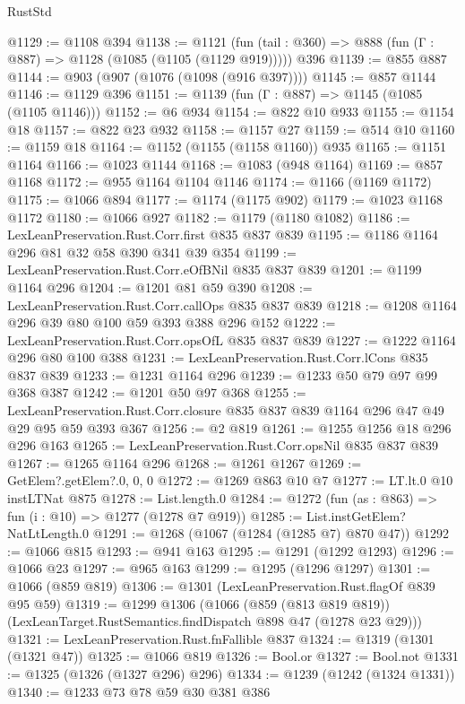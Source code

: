 \begin{lexlean}{RustStd}
\begin{coremodule}
{\begin{coremodule}
{{{{{{{{{@1129 := @1108 @394
@1138 := @1121
    (fun (tail : @360) => @888 (fun (Γ : @887) => @1128 (@1085 (@1105 (@1129 @919)))))
    @396
@1139 := @855 @887
@1144 := @903 (@907 (@1076 (@1098 (@916 @397))))
@1145 := @857 @1144
@1146 := @1129 @396
@1151 := @1139 (fun (Γ : @887) => @1145 (@1085 (@1105 @1146)))
@1152 := @6 @934
@1154 := @822 @10 @933
@1155 := @1154 @18
@1157 := @822 @23 @932
@1158 := @1157 @27
@1159 := @514 @10
@1160 := @1159 @18
@1164 := @1152 (@1155 (@1158 @1160)) @935
@1165 := @1151 @1164
@1166 := @1023 @1144
@1168 := @1083 (@948 @1164)
@1169 := @857 @1168
@1172 := @955 @1164 @1104 @1146
@1174 := @1166 (@1169 @1172)
@1175 := @1066 @894
@1177 := @1174 (@1175 @902)
@1179 := @1023 @1168 @1172
@1180 := @1066 @927
@1182 := @1179 (@1180 @1082)
@1186 := LexLeanPreservation.Rust.Corr.first @835 @837 @839
@1195 := @1186 @1164 @296 @81 @32 @58 @390 @341 @39 @354
@1199 := LexLeanPreservation.Rust.Corr.eOfBNil @835 @837 @839
@1201 := @1199 @1164 @296
@1204 := @1201 @81 @59 @390
@1208 := LexLeanPreservation.Rust.Corr.callOps @835 @837 @839
@1218 := @1208 @1164 @296 @39 @80 @100 @59 @393 @388 @296 @152
@1222 := LexLeanPreservation.Rust.Corr.opsOfL @835 @837 @839
@1227 := @1222 @1164 @296 @80 @100 @388
@1231 := LexLeanPreservation.Rust.Corr.lCons @835 @837 @839
@1233 := @1231 @1164 @296
@1239 := @1233 @50 @79 @97 @99 @368 @387
@1242 := @1201 @50 @97 @368
@1255 := LexLeanPreservation.Rust.Corr.closure
    @835
    @837
    @839
    @1164
    @296
    @47
    @49
    @29
    @95
    @59
    @393
    @367
@1256 := @2 @819
@1261 := @1255 @1256 @18 @296 @296 @163
@1265 := LexLeanPreservation.Rust.Corr.opsNil @835 @837 @839
@1267 := @1265 @1164 @296
@1268 := @1261 @1267
@1269 := GetElem?.getElem?.{0, 0, 0}
@1272 := @1269 @863 @10 @7
@1277 := LT.lt.{0} @10 instLTNat @875
@1278 := List.length.{0}
@1284 := @1272 (fun (as : @863) => fun (i : @10) => @1277 (@1278 @7 @919))
@1285 := List.instGetElem?NatLtLength.{0}
@1291 := @1268 (@1067 (@1284 (@1285 @7) @870 @47))
@1292 := @1066 @815
@1293 := @941 @163
@1295 := @1291 (@1292 @1293)
@1296 := @1066 @23
@1297 := @965 @163
@1299 := @1295 (@1296 @1297)
@1301 := @1066 (@859 @819)
@1306 := @1301 (LexLeanPreservation.Rust.flagOf @839 @95 @59)
@1319 := @1299
    @1306
    (@1066
      (@859 (@813 @819 @819))
      (LexLeanTarget.RustSemantics.findDispatch @898 @47 (@1278 @23 @29)))
@1321 := LexLeanPreservation.Rust.fnFallible @837
@1324 := @1319 (@1301 (@1321 @47))
@1325 := @1066 @819
@1326 := Bool.or
@1327 := Bool.not
@1331 := @1325 (@1326 (@1327 @296) @296)
@1334 := @1239 (@1242 (@1324 @1331))
@1340 := @1233 @73 @78 @59 @30 @381 @386
}}}}}}}}}
\end{coremodule}}
\end{coremodule}
\end{lexlean}

